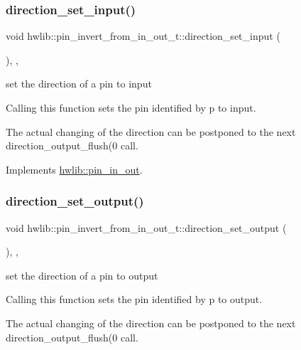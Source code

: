 \subsubsection{\texorpdfstring{direction\+\_\+set\+\_\+input()}{direction\_set\_input()}}
{\footnotesize\ttfamily void hwlib\+::pin\+\_\+invert\+\_\+from\+\_\+in\+\_\+out\+\_\+t\+::direction\+\_\+set\+\_\+input (\begin{DoxyParamCaption}{ }\end{DoxyParamCaption})\hspace{0.3cm}{\ttfamily [inline]}, {\ttfamily [override]}, {\ttfamily [virtual]}}

set the direction of a pin to input

Calling this function sets the pin identified by p to input.

The actual changing of the direction can be postponed to the next direction\+\_\+output\+\_\+flush(0 call. 

Implements \hyperlink{classhwlib_1_1pin__in__out_a54ce1a5086d3c9e7b868511b1d46acd0}{hwlib\+::pin\+\_\+in\+\_\+out}.

\mbox{\label{classhwlib_1_1pin__invert__from__in__out__t_ae790759c546b1cd54c55b6aa3ec84600}} 
\subsubsection{\texorpdfstring{direction\+\_\+set\+\_\+output()}{direction\_set\_output()}}
{\footnotesize\ttfamily void hwlib\+::pin\+\_\+invert\+\_\+from\+\_\+in\+\_\+out\+\_\+t\+::direction\+\_\+set\+\_\+output (\begin{DoxyParamCaption}{ }\end{DoxyParamCaption})\hspace{0.3cm}{\ttfamily [inline]}, {\ttfamily [override]}, {\ttfamily [virtual]}}

set the direction of a pin to output

Calling this function sets the pin identified by p to output.

The actual changing of the direction can be postponed to the next direction\+\_\+output\+\_\+flush(0 call. 

